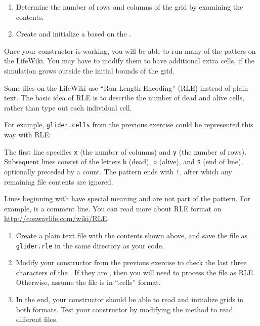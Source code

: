 \begin{exercise}
\begin{enumerate}
\item Determine the number of rows and columns of the grid by examining the  contents.

\item Create and initialize a  based on the .

\end{enumerate}

Once your constructor is working, you will be able to run many of the patters on the LifeWiki.
You may have to modify them to have additional extra cells, if the simulation grows outside the initial bounds of the grid.

\end{exercise}


\begin{exercise}
Some files on the LifeWiki use ``Run Length Encoding'' (RLE) instead of plain text.
The basic idea of RLE is to describe the number of dead and alive cells, rather than type out each individual cell.

For example, \verb|glider.cells| from the previous exercise could be represented this way with RLE:


The first line specifies \verb|x| (the number of columns) and \verb|y| (the number of rows).
Subsequent lines consist of the letters \verb|b| (dead), \verb|o| (alive), and \verb|$| (end of line), optionally preceded by a count.
The pattern ends with \verb|!|, after which any remaining file contents are ignored.

Lines beginning with \java{#} have special meaning and are not part of the pattern.
For example,  is a comment line.
You can read more about RLE format on \url{http://conwaylife.com/wiki/RLE}.

\begin{enumerate}

\item Create a plain text file with the contents shown above, and save the file as \verb|glider.rle| in the same directory as your code.

\item Modify your constructor from the previous exercise to check the last three characters of the .
If they are , then you will need to process the file as RLE.
Otherwise, assume the file is in ``.cells'' format.

\item In the end, your constructor should be able to read and initialize grids in both formats.
Test your constructor by modifying the  method to read different files.

\end{enumerate}

\end{exercise}

